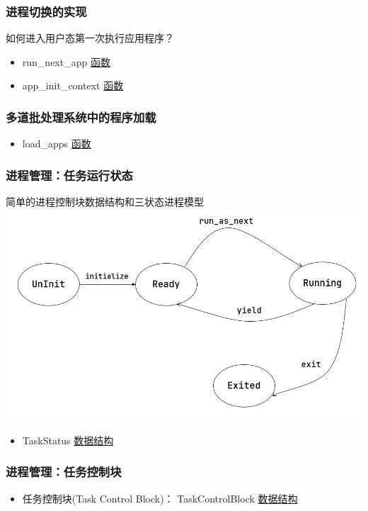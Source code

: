 \begin{frame}
	\frametitle{进程切换的实现}
% 
如何进入用户态第一次执行应用程序？
% 
\begin{itemize}
	\item run\_next\_app \href{https://github.com/rcore-os/rCore-Tutorial-v3/blob/ch2/os/src/batch.rs\#L116}{函数}
	\item app\_init\_context \href{https://github.com/rcore-os/rCore-Tutorial-v3/blob/ch2/os/src/trap/context.rs\#L12}{函数}
\end{itemize}
\end{frame}
\begin{frame}
	\frametitle{多道批处理系统中的程序加载}
% 
\begin{itemize}
	\item load\_apps \href{https://github.com/rcore-os/rCore-Tutorial-v3/blob/ch3-coop/os/src/loader.rs\#L55}{函数}
\end{itemize}
\end{frame}
\begin{frame}
	\frametitle{进程管理：任务运行状态}
% 
简单的进程控制块数据结构和三状态进程模型
% 
\includegraphics[width=0.6\linewidth]{figs/fsm-coop.png}
% 
\begin{itemize}
	\item  TaskStatus \href{https://github.com/rcore-os/rCore-Tutorial-v3/blob/ch3-coop/os/src/task/task.rs\#L13}{数据结构}
\end{itemize}
\end{frame}
\begin{frame}
	\frametitle{进程管理：任务控制块}
% 
\begin{itemize}
	\item 任务控制块(Task Control Block)： TaskControlBlock  \href{https://github.com/rcore-os/rCore-Tutorial-v3/blob/ch3-coop/os/src/task/task.rs\#L1}{数据结构}

\end{itemize}
\end{frame}
